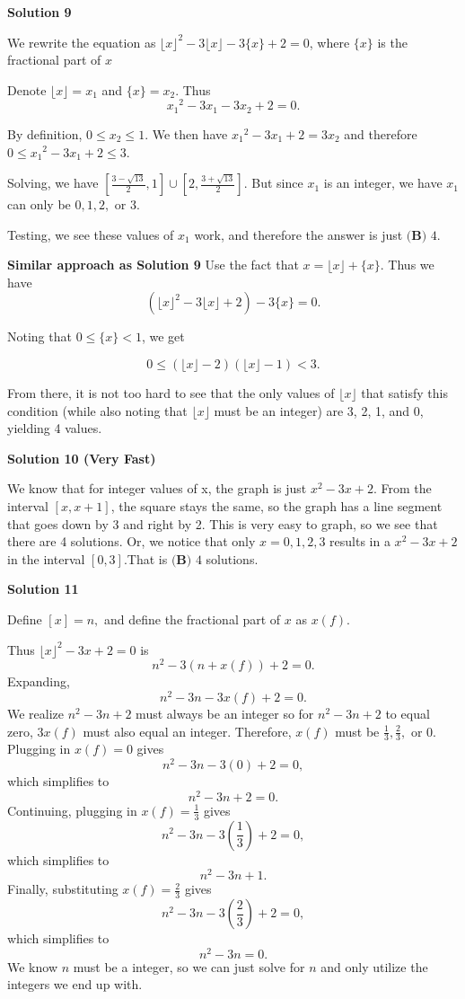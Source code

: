 \begin{enumerate}
 



\textbf{Solution 9}

We rewrite the equation as ${\lfloor x\rfloor}^2-3\lfloor x\rfloor-3\{x\}+2=0$, where $\{x\}$ is the fractional part of $x$

 Denote $\lfloor x\rfloor = x_1$ and $\{x\} = x_2.$ Thus
 \[{x_1}^2-3{x_1}-3{x_2}+2=0.\]

 By definition, $0\leq x_2\leq 1$. We then have ${x_1}^2-3{x_1}+2=3{x_2}$ and therefore $0\leq {x_1}^2-3{x_1}+2\leq 3$.

 Solving, we have $\left[\frac{3-\sqrt{13}}{2},1\right]\cup \left[2,\frac{3+\sqrt{13}}{2}\right]$. But since $x_1$ is an integer, we have $x_1$ can only be $0,1,2,$ or $3$.

 Testing, we see these values of $x_1$ work, and therefore the answer is just $\boxed{\textbf{(B) }4}$.

 \textbf{Similar approach as Solution 9} Use the fact that $x = \lfloor x \rfloor + \{x\}$. Thus we have 
 \[(\lfloor x \rfloor^2 - 3\lfloor x \rfloor + 2) - 3\{x\} = 0.\]

 Noting that $0 \leq \{x\} < 1$, we get 

 
 \[0 \leq (\lfloor x \rfloor - 2)(\lfloor x \rfloor - 1) < 3.\]

 From there, it is not too hard to see that the only values of $\lfloor x \rfloor$ that satisfy this condition (while also noting that $\lfloor x \rfloor$ must be an integer) are 3, 2, 1, and 0, yielding 4 values.

 



\textbf{Solution 10 (Very Fast)}

We know that for integer values of x, the graph is just $x^2-3x+2$. From the interval $[x, x+1]$, the square stays the same, so the graph has a line segment that goes down by 3 and right by 2. This is very easy to graph, so we see that there are 4 solutions. Or, we notice that only $x = 0, 1, 2, 3$ results in a $x^2-3x+2$ in the interval $[0, 3]$.That is $\boxed{\textbf{(B) }4}$ solutions.

 



\textbf{Solution 11}

Define $[x] = n,$ and define the fractional part of $x$ as $x(f).$

 Thus $\lfloor{x}\rfloor^2-3x+2=0$ is 
 \[n^2-3(n+x(f))+2=0.\] Expanding, 
 \[n^2-3n-3x(f)+2=0.\] We realize $n^2-3n+2$ must always be an integer so for $n^2-3n+2$ to equal zero, $3x(f)$ must also equal an integer. Therefore, $x(f)$ must be $\frac{1}{3}, \frac{2}{3},$ or $0.$ Plugging in $x(f)=0$ gives 
 \[n^2-3n-3(0)+2=0,\] which simplifies to 
 \[n^2-3n+2=0.\] Continuing, plugging in $x(f)=\frac{1}{3}$ gives 
 \[n^2-3n-3\left(\frac{1}{3}\right)+2=0,\] which simplifies to 
 \[n^2-3n+1.\] Finally, substituting $x(f)=\frac{2}{3}$ gives 
 \[n^2-3n-3\left(\frac{2}{3}\right)+2=0,\] which simplifies to 
 \[n^2-3n=0.\] We know $n$ must be a integer, so we can just solve for $n$ and only utilize the integers we end up with. 


\end{enumerate}
